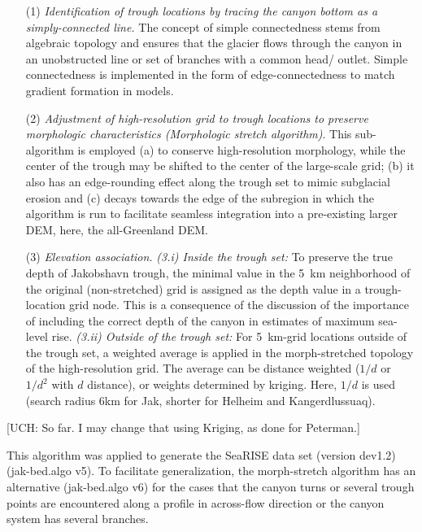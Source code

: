 \documentclass[11pt]{article}
\begin{document}
\begin{itemize}
\item[(1)] {\it Identification of trough locations by tracing the canyon bottom as a simply-connected line.} The concept of 
simple connectedness stems from algebraic topology and ensures that the glacier flows through the canyon in an unobstructed line or set of branches with a common head/ outlet.  Simple connectedness is implemented in the form of edge-connectedness to match gradient formation in models.
 
\item[(2)] {\it Adjustment of high-resolution grid to trough locations to preserve morphologic characteristics (Morphologic stretch algorithm)}. This sub-algorithm is employed (a) to conserve high-resolution morphology, while the center of the trough may be shifted to the center of the large-scale grid; (b) it also has an edge-rounding effect along the trough set to mimic subglacial erosion and (c) decays towards  the edge of the subregion in which the algorithm is run to facilitate seamless integration into a pre-existing larger DEM, here, the all-Greenland DEM. 

\item[(3)] {\it  Elevation association.} 
{\it (3.i) Inside the trough set: } To preserve the true depth of Jakobshavn trough, the minimal value in the 5~km neighborhood of the original (non-stretched) grid is assigned as the depth value in a trough-location grid node. This is a consequence of the discussion of the importance of including the correct depth of the canyon in estimates of maximum sea-level rise.
{\it (3.ii) Outside of the trough set:}  For 5~km-grid locations outside of the trough set, a weighted average is applied in the morph-stretched topology of the high-resolution grid. 
The average can be distance weighted ($1/d$  or $1/d^2$ with $d$ distance), or weights determined by kriging.  
Here, $1/d$ is used (search radius 6km for Jak, shorter for Helheim and Kangerdlussuaq).
\end{itemize}

[UCH: So far. I may change that using Kriging, as done for Peterman.]

This algorithm was applied to generate the SeaRISE data set (version dev1.2) (jak-bed.algo v5).
 To facilitate generalization, the morph-stretch algorithm has an alternative (jak-bed.algo v6) for the cases that
 the canyon turns or several trough points are encountered along a profile in across-flow direction or the canyon system has several branches.
 
\end{document}
